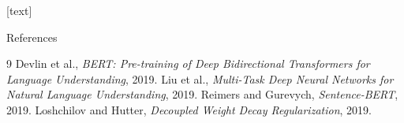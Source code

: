 \documentclass[t, aspectratio=169]{beamer}
\begin{document}
\useStyleLogoOnly
{}[text]

\begin{frame}{References}
    \begin{thebibliography}{9}
         Devlin et al., \emph{BERT: Pre-training of Deep Bidirectional Transformers for Language Understanding}, 2019.
         Liu et al., \emph{Multi-Task Deep Neural Networks for Natural Language Understanding}, 2019.
         Reimers and Gurevych, \emph{Sentence-BERT}, 2019.
         Loshchilov and Hutter, \emph{Decoupled Weight Decay Regularization}, 2019.
    \end{thebibliography}
\end{frame}
\end{document}
